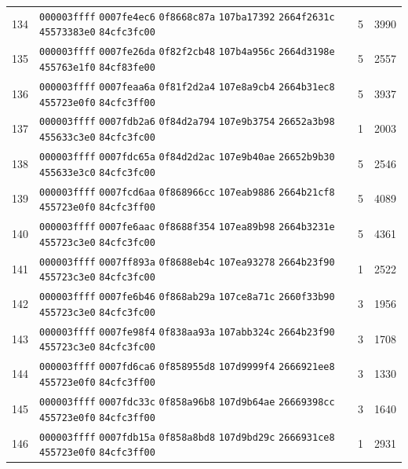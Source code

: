 \begin{longtable}{@{}r p{12cm} r r@{}}
134 & \texttt{000003ffff} \texttt{0007fe4ec6} \texttt{0f8668c87a} \texttt{107ba17392} \texttt{2664f2631c} \texttt{45573383e0} \texttt{84cfc3fc00} & 5 & 3990 \\
135 & \texttt{000003ffff} \texttt{0007fe26da} \texttt{0f82f2cb48} \texttt{107b4a956c} \texttt{2664d3198e} \texttt{455763e1f0} \texttt{84cf83fe00} & 5 & 2557 \\
136 & \texttt{000003ffff} \texttt{0007feaa6a} \texttt{0f81f2d2a4} \texttt{107e8a9cb4} \texttt{2664b31ec8} \texttt{455723e0f0} \texttt{84cfc3ff00} & 5 & 3937 \\
137 & \texttt{000003ffff} \texttt{0007fdb2a6} \texttt{0f84d2a794} \texttt{107e9b3754} \texttt{26652a3b98} \texttt{455633c3e0} \texttt{84cfc3fc00} & 1 & 2003 \\
138 & \texttt{000003ffff} \texttt{0007fdc65a} \texttt{0f84d2d2ac} \texttt{107e9b40ae} \texttt{26652b9b30} \texttt{455633e3c0} \texttt{84cfc3fc00} & 5 & 2546 \\
139 & \texttt{000003ffff} \texttt{0007fcd6aa} \texttt{0f868966cc} \texttt{107eab9886} \texttt{2664b21cf8} \texttt{455723e0f0} \texttt{84cfc3ff00} & 5 & 4089 \\
140 & \texttt{000003ffff} \texttt{0007fe6aac} \texttt{0f8688f354} \texttt{107ea89b98} \texttt{2664b3231e} \texttt{455723c3e0} \texttt{84cfc3fc00} & 5 & 4361 \\
141 & \texttt{000003ffff} \texttt{0007ff893a} \texttt{0f8688eb4c} \texttt{107ea93278} \texttt{2664b23f90} \texttt{455723c3e0} \texttt{84cfc3fc00} & 1 & 2522 \\
142 & \texttt{000003ffff} \texttt{0007fe6b46} \texttt{0f868ab29a} \texttt{107ce8a71c} \texttt{2660f33b90} \texttt{455723c3e0} \texttt{84cfc3fc00} & 3 & 1956 \\
143 & \texttt{000003ffff} \texttt{0007fe98f4} \texttt{0f838aa93a} \texttt{107abb324c} \texttt{2664b23f90} \texttt{455723c3e0} \texttt{84cfc3fc00} & 3 & 1708 \\
144 & \texttt{000003ffff} \texttt{0007fd6ca6} \texttt{0f858955d8} \texttt{107d9999f4} \texttt{2666921ee8} \texttt{455723e0f0} \texttt{84cfc3ff00} & 3 & 1330 \\
145 & \texttt{000003ffff} \texttt{0007fdc33c} \texttt{0f858a96b8} \texttt{107d9b64ae} \texttt{26669398cc} \texttt{455723e0f0} \texttt{84cfc3ff00} & 3 & 1640 \\
146 & \texttt{000003ffff} \texttt{0007fdb15a} \texttt{0f858a8bd8} \texttt{107d9bd29c} \texttt{2666931ce8} \texttt{455723e0f0} \texttt{84cfc3ff00} & 1 & 2931 \\

\end{longtable}
